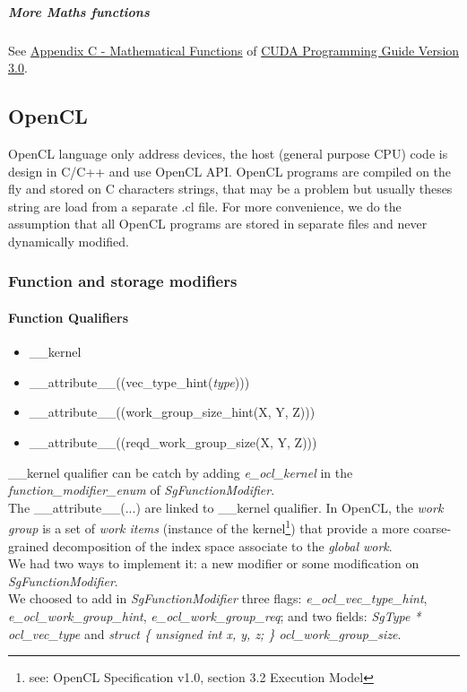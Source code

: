 					\subparagraph{More Maths functions}

See \underline{Appendix C - Mathematical Functions} of \underline{CUDA Programming Guide Version 3.0}.
		
		\subsection{OpenCL}
		
OpenCL language only address devices, the host (general purpose CPU) code is design in C/C++ and use OpenCL API. OpenCL programs are compiled on the
fly and stored on C characters strings, that may be a problem but usually theses string are load from a separate .cl file. For more convenience,
we do the assumption that all OpenCL programs are stored in separate files and never dynamically modified.
		
			\subsubsection{Function and storage modifiers}

				\paragraph{Function Qualifiers}

\begin{itemize}
	\item \_\_kernel
	\item \_\_attribute\_\_((vec\_type\_hint(\emph{type})))
	\item \_\_attribute\_\_((work\_group\_size\_hint(X, Y, Z)))
	\item \_\_attribute\_\_((reqd\_work\_group\_size(X, Y, Z)))
\end{itemize}

\_\_kernel qualifier can be catch by adding \emph{e\_ocl\_kernel} in the \emph{function\_modifier\_enum} of \emph{SgFunctionModifier}.\\

The \_\_attribute\_\_(...) are linked to \_\_kernel qualifier. In OpenCL, the  \emph{work group} is a set of  \emph{work items} (instance of
the kernel\footnote{see: OpenCL Specification v1.0, section 3.2 Execution Model}) that provide a more coarse-grained decomposition of the
index space associate to the \emph{global work}.\\
We had two ways to implement it: a new modifier or some modification on \emph{SgFunctionModifier}.\\
We choosed to add in \emph{SgFunctionModifier} three flags: \emph{e\_ocl\_vec\_type\_hint}, \emph{e\_ocl\_work\_group\_hint}, 
\emph{e\_ocl\_work\_group\_req}; and two fields: \emph{SgType * ocl\_vec\_type} and \emph{struct \{ unsigned int x, y, z; \} ocl\_work\_group\_size}.

